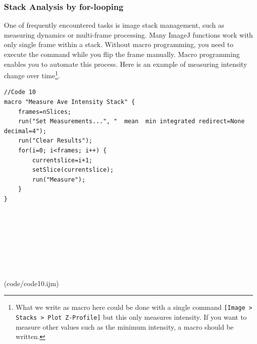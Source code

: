 \documentclass[11pt,a4paper,oneside]{report}
\newcommand{\ilcom}[1]{\texttt{\small#1}}
\begin{document}
\subsubsection{Stack Analysis by for-looping}
\label{sec:forloopStack}
One of frequently encountered tasks is image stack management, 
such as measuring dynamics or multi-frame processing. 
Many ImageJ functions work with only single frame within a stack. 
Without macro programming, you need to execute the command while you flip the frame manually. 
Macro programming enables you to automate this process. 
Here is an example of measuring intensity change over time\footnote{What we write as macro here could be done with a single command \ilcom{[Image > Stacks > Plot Z-Profile]} but this only measures intensity. If you want to measure other values such as the minimum intensity, a macro should be written. }. 

\label{code:10}

\begin{lstlisting}[morekeywords={*, run, setSlice, nSlices}]
//Code 10
macro "Measure Ave Intensity Stack" {
	frames=nSlices;
	run("Set Measurements...", "  mean  min integrated redirect=None decimal=4");
	run("Clear Results");
	for(i=0; i<frames; i++) {
		currentslice=i+1;
		setSlice(currentslice);
		run("Measure");
	}
}








\end{lstlisting}
(code/code10.ijm)
\end{document}
